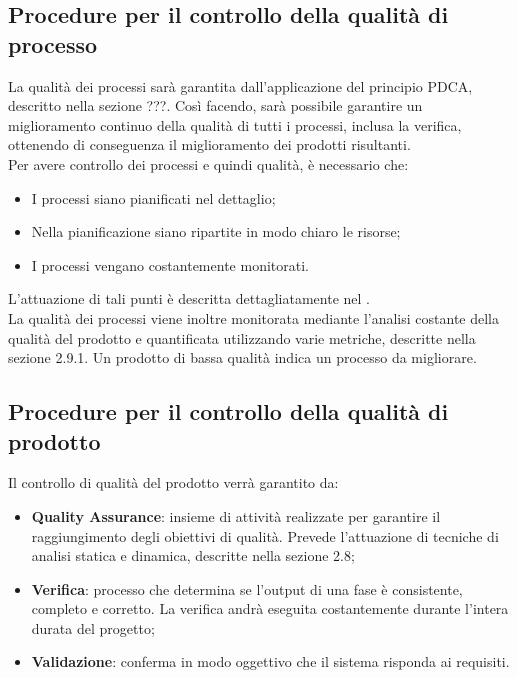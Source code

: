 \subsection{Procedure per il controllo della qualità di processo}
La qualità dei processi sarà garantita dall'applicazione del principio PDCA, descritto nella sezione ???. Così facendo, sarà possibile garantire un miglioramento continuo della qualità di tutti i processi, inclusa la verifica, ottenendo di conseguenza il miglioramento dei prodotti risultanti.\\
Per avere controllo dei processi e quindi qualità, è necessario che:
\begin{itemize}
\item I processi siano pianificati nel dettaglio;
\item Nella pianificazione siano ripartite in modo chiaro le risorse;
\item I processi vengano costantemente monitorati.
\end{itemize}
L'attuazione di tali punti è descritta dettagliatamente nel \textit{\PdP}.\\
La qualità dei processi viene inoltre monitorata mediante l'analisi costante della qualità del prodotto e quantificata utilizzando varie metriche, descritte nella sezione 2.9.1. Un prodotto di bassa qualità indica un processo da migliorare.

\subsection{Procedure per il controllo della qualità di prodotto}
Il controllo di qualità del prodotto verrà garantito da:
\begin{itemize}
\item \textbf{Quality Assurance}: insieme di attività realizzate per garantire il raggiungimento degli obiettivi di qualità. Prevede l'attuazione di tecniche di analisi statica e dinamica, descritte nella sezione 2.8;
\item \textbf{Verifica}: processo che determina se l'output di una fase è consistente, completo e corretto. La verifica andrà eseguita costantemente durante l'intera durata del progetto;
\item \textbf{Validazione}: conferma in modo oggettivo che il sistema risponda ai requisiti. 
\end{itemize}

